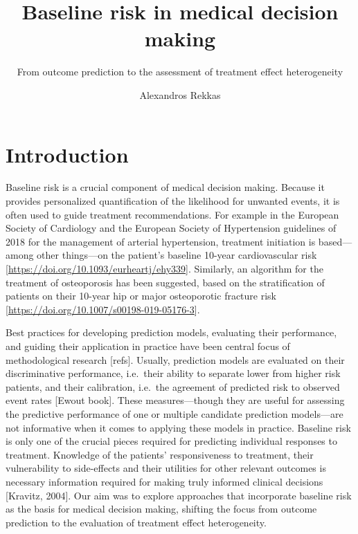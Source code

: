 \documentclass[
]{book}
\title{Baseline risk in medical decision making}
\subtitle{From outcome prediction to the assessment of treatment effect heterogeneity}
\author{Alexandros Rekkas}
\date{}
\begin{document}
\maketitle

{
\setcounter{tocdepth}{1}
\tableofcontents
}
\hypertarget{introduction}{%
\chapter{Introduction}\label{introduction}}

Baseline risk is a crucial component of medical decision making. Because it
provides personalized quantification of the likelihood for unwanted events, it
is often used to guide treatment recommendations. For example in the European
Society of Cardiology and the European Society of Hypertension guidelines of
2018 for the management of arterial hypertension, treatment initiation is
based---among other things---on the patient's baseline 10-year cardiovascular
risk {[}\url{https://doi.org/10.1093/eurheartj/ehy339}{]}. Similarly, an algorithm for the
treatment of osteoporosis has been suggested, based on the stratification of
patients on their 10-year hip or major osteoporotic fracture risk
{[}\url{https://doi.org/10.1007/s00198-019-05176-3}{]}.

Best practices for developing prediction models, evaluating their performance,
and guiding their application in practice have been central focus of
methodological research {[}refs{]}. Usually, prediction models are evaluated on
their discriminative performance, i.e.~their ability to separate lower from
higher risk patients, and their calibration, i.e.~the agreement of predicted
risk to observed event rates {[}Ewout book{]}. These measures---though they are
useful for assessing the predictive performance of one or multiple candidate
prediction models---are not informative when it comes to applying these models
in practice. Baseline risk is only one of the crucial pieces required for
predicting individual responses to treatment. Knowledge of the patients'
responsiveness to treatment, their vulnerability to side-effects and their
utilities for other relevant outcomes is necessary information required for
making truly informed clinical decisions {[}Kravitz, 2004{]}. Our aim was to explore
approaches that incorporate baseline risk as the basis for medical decision
making, shifting the focus from outcome prediction to the evaluation of
treatment effect heterogeneity.
\end{document}
